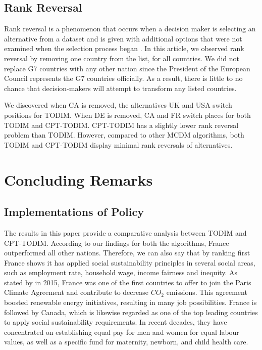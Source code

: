 \documentclass{infor}
\theoremstyle{remark}
\begin{document}
\subsection{Rank Reversal}
Rank reversal is a phenomenon that occurs when a decision maker is selecting an alternative from a dataset and is given with additional options that were not examined when the selection process began \citep{aires2018rank}. In this article, we observed rank reversal by removing one country from the list, for all countries. We did not replace G7 countries with any other nation since the President of the European Council represents the G7 countries officially. As a result, there is little to no chance that decision-makers will attempt to transform any listed countries.

We discovered when CA is removed, the alternatives UK and USA switch positions for TODIM. When DE is removed, CA and FR switch places for both TODIM and CPT-TODIM. CPT-TODIM has a slightly lower rank reversal problem than TODIM. However, compared to other MCDM algorithms, both TODIM and CPT-TODIM display minimal rank reversals of alternatives.

\section{Concluding Remarks}

\subsection{Implementations of Policy}

The results in this paper provide a comparative analysis between TODIM and CPT-TODIM. According to our findings for both the algorithms, France outperformed all other nations. Therefore, we can also say that by ranking first France shows it has applied social sustainability principles in several social areas, such as employment rate, household wage, income fairness and inequity. As stated by \cite{torkayesh2021comparative} in 2015, France was one of the first countries to offer to join the Paris Climate Agreement and contribute to decrease \(CO_2\) emissions. This agreement boosted renewable energy initiatives, resulting in many job possibilities. France is followed by Canada, which is likewise regarded as one of the top leading countries to apply social sustainability requirements. In recent decades, they have concentrated on establishing equal pay for men and women for equal labour values, as well as a specific fund for maternity, newborn, and child health care.
\end{document}
